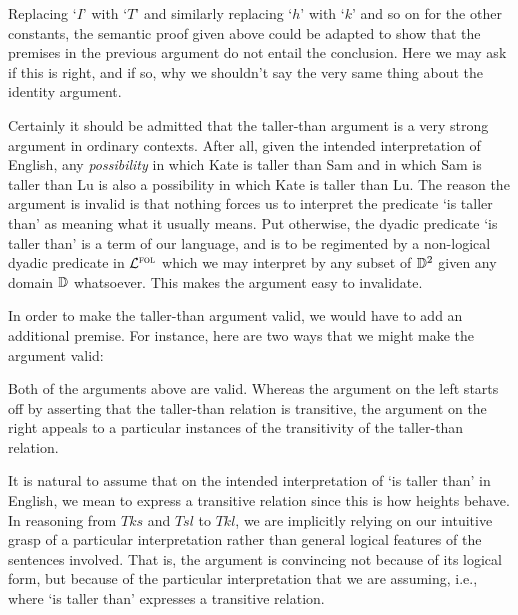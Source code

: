 Replacing `$I$' with `$T$' and similarly replacing `$h$' with `$k$' and so on for the other constants, the semantic proof given above could be adapted to show that the premises in the previous argument do not entail the conclusion.
Here we may ask if this is right, and if so, why we shouldn't say the very same thing about the identity argument.

Certainly it should be admitted that the taller-than argument is a very strong argument in ordinary contexts.
After all, given the intended interpretation of English, any \textit{possibility} in which Kate is taller than Sam and in which Sam is taller than Lu is also a possibility in which Kate is taller than Lu. 
The reason the argument is invalid is that nothing forces us to interpret the predicate `is taller than' as meaning what it usually means.
Put otherwise, the dyadic predicate `is taller than' is a  term of our language, and is to be regimented by a non-logical dyadic predicate in $\mathcal{L}^{\textsc{fol}}$ which we may interpret by any subset of $\mathbb{D}^2$ given any domain $\mathbb{D}$ whatsoever. 
This makes the argument easy to invalidate.

In order to make the taller-than argument valid, we would have to add an additional premise.
For instance, here are two ways that we might make the argument valid:

\begin{multicols}{2}
  
  \begin{earg}
  \end{earg}

  \begin{earg}
  \end{earg}

\end{multicols}

Both of the arguments above are valid.
Whereas the argument on the left starts off by asserting that the taller-than relation is transitive, the argument on the right appeals to a particular instances of the transitivity of the taller-than relation.

It is natural to assume that on the intended interpretation of `is taller than' in English, we mean to express a transitive relation since this is how heights behave.
In reasoning from $Tks$ and $Tsl$ to $Tkl$, we are implicitly relying on our intuitive grasp of a particular interpretation rather than general logical features of the sentences involved. 
That is, the argument is convincing not because of its logical form, but because of the particular interpretation that we are assuming, i.e., where `is taller than' expresses a transitive relation.

